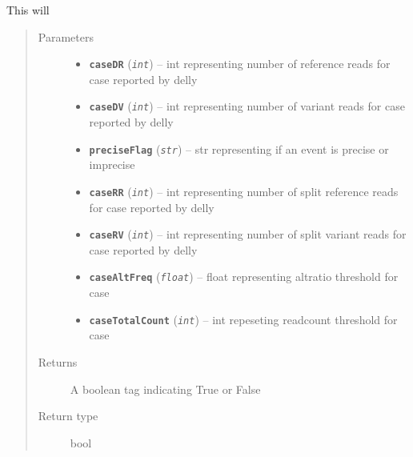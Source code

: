 \documentclass[letterpaper,10pt,english]{sphinxmanual}
\begin{document}
\begin{fulllineitems}
\label{iCallSV:iCallSV.FilterDellyCalls.GetCaseFlag}
This will 
\begin{quote}\begin{description}
\item[{Parameters}] \leavevmode\begin{itemize}
\item {} 
\textbf{\texttt{caseDR}} (\emph{\texttt{int}}) -- int representing number of reference reads for case reported by delly

\item {} 
\textbf{\texttt{caseDV}} (\emph{\texttt{int}}) -- int representing number of variant reads for case reported by delly

\item {} 
\textbf{\texttt{preciseFlag}} (\emph{\texttt{str}}) -- str representing if an event is precise or imprecise

\item {} 
\textbf{\texttt{caseRR}} (\emph{\texttt{int}}) -- int representing number of split reference reads for case reported by delly

\item {} 
\textbf{\texttt{caseRV}} (\emph{\texttt{int}}) -- int representing number of split variant reads for case reported by delly

\item {} 
\textbf{\texttt{caseAltFreq}} (\emph{\texttt{float}}) -- float representing altratio threshold for case

\item {} 
\textbf{\texttt{caseTotalCount}} (\emph{\texttt{int}}) -- int repeseting readcount threshold for case

\end{itemize}

\item[{Returns}] \leavevmode
A boolean tag indicating True or False

\item[{Return type}] \leavevmode
bool

\end{description}\end{quote}

\end{fulllineitems}
\end{document}
